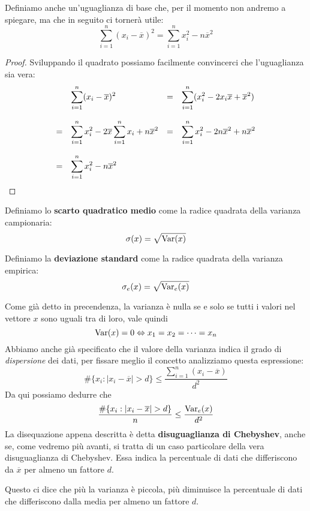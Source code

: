 \begin{definition}

	Definiamo anche un'uguaglianza di base che, per il momento non andremo a spiegare, ma che in seguito ci tornerà
	utile:
	\[ \sum_{i=1}^n (x_i - \overline{x})^2 = \sum_{i=1}^n x_i^2 - n \overline{x}^2 \]
	\begin{proof}
		Sviluppando il quadrato possiamo facilmente convincerci che l'uguaglianza sia vera:
		\[
			\begin{array}{ l l l l }
				  & \displaystyle\sum_{i=1}^n (x_i - \overline{x})^2                                     & = &
				\displaystyle\sum_{i=1}^n (x_i^2 - 2x_i \overline{x} + \overline{x}^2)                         \\
				\\
				= & \displaystyle\sum_{i=1}^n x_i^2 - 2 \overline{x} \sum_{i=1}^n x_i + n \overline{x}^2 &
				= & \displaystyle\sum_{i=1}^n x_i^2 - 2 n \overline{x}^2 + n \overline{x}^2                    \\
				\\
				= & \displaystyle\sum_{i=1}^n x_i^2 - n \overline{x}^2
			\end{array}
		\]
	\end{proof}
\end{definition}

\begin{definition}
	Definiamo lo \textbf{scarto quadratico medio} come la radice quadrata della varianza campionaria:
	\[ \sigma (x) = \sqrt{\operatorname{Var} (x)} \]
\end{definition}

\begin{definition}
	Definiamo la \textbf{deviazione standard} come la radice quadrata della varianza empirica:
	\[ \sigma_e (x) = \sqrt{\operatorname{Var}_e (x)} \]
\end{definition}

Come già detto in precendenza, la varianza è nulla se e solo se tutti i valori nel vettore $x$ sono uguali tra di loro,
vale quindi
\[ \operatorname{Var}(x) = 0 \Leftrightarrow x_1 = x_2 = \dots = x_n \]
Abbiamo anche già specificato che il valore della varianza indica il grado di \emph{dispersione} dei dati, per fissare
meglio il concetto analizziamo questa espressione:
\[ \# \{ x_i : |x_i - \overline{x}| > d  \} \leq \frac{\displaystyle\sum_{i=1}^n (x_i - \overline{x})}{d^2} \]
Da qui possiamo dedurre che
\[ \frac{\# \{ x_i : |x_i - \overline{x}| > d \}}{n} \leq \frac{\operatorname{Var}_e(x)}{d^2} \]
La disequazione appena descritta è detta \textbf{disuguaglianza di Chebyshev}, anche se, come vedremo più avanti, si
tratta di un caso particolare della vera disuguaglianza di Chebyshev. Essa indica la percentuale di dati che differiscono
da $\overline{x}$ per almeno un fattore $d$.

\begin{observation}
	Questo ci dice che più la varianza è piccola, più diminuisce la percentuale di dati che differiscono dalla media per
	almeno un fattore $d$.
\end{observation}